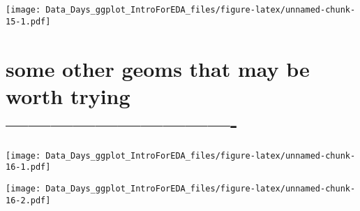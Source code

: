 \documentclass[
]{article}
\newenvironment{Shaded}{\begin{snugshade}}{\end{snugshade}}
\newcommand{\CommentTok}[1]{\textcolor[rgb]{0.56,0.35,0.01}{\textit{#1}}}
\newcommand{\DataTypeTok}[1]{\textcolor[rgb]{0.13,0.29,0.53}{#1}}
\newcommand{\DecValTok}[1]{\textcolor[rgb]{0.00,0.00,0.81}{#1}}
\newcommand{\KeywordTok}[1]{\textcolor[rgb]{0.13,0.29,0.53}{\textbf{#1}}}
\newcommand{\NormalTok}[1]{#1}
\newcommand{\OperatorTok}[1]{\textcolor[rgb]{0.81,0.36,0.00}{\textbf{#1}}}
\newcommand{\StringTok}[1]{\textcolor[rgb]{0.31,0.60,0.02}{#1}}
\begin{document}
\begin{Shaded}
\end{Shaded}

\texttt{[image: Data\_Days\_ggplot\_IntroForEDA\_files/figure-latex/unnamed-chunk-15-1.pdf]}

\hypertarget{some-other-geoms-that-may-be-worth-trying--}{%
\section{some other geoms that may be worth trying
-------------------------------}\label{some-other-geoms-that-may-be-worth-trying--}}

\begin{Shaded}
\end{Shaded}

\texttt{[image: Data\_Days\_ggplot\_IntroForEDA\_files/figure-latex/unnamed-chunk-16-1.pdf]}

\begin{Shaded}
\end{Shaded}

\texttt{[image: Data\_Days\_ggplot\_IntroForEDA\_files/figure-latex/unnamed-chunk-16-2.pdf]}
\end{document}
